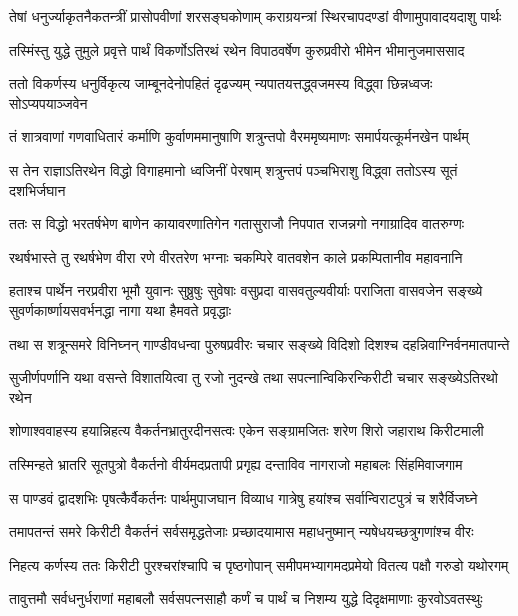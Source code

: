 \twolineshloka
{तेषां धनुर्ज्याकृतनैकतन्त्रीं प्रासोपवीणां शरसङ्घकोणाम्}
{कराग्रयन्त्रां स्थिरचापदण्डां वीणामुपावादयदाशु पार्थः}


\twolineshloka
{तस्मिंस्तु युद्धे तुमुले प्रवृत्ते पार्थं विकर्णोऽतिरथं रथेन}
{विपाठवर्षेण कुरुप्रवीरो भीमेन भीमानुजमाससाद}


\twolineshloka
{ततो विकर्णस्य धनुर्विकृत्य जाम्बूनदेनोपहितं दृढज्यम्}
{न्यपातयत्तद्ध्वजमस्य विद्ध्वा छिन्नध्वजः सोऽप्यपयाञ्जवेन}


\twolineshloka
{तं शात्रवाणां गणवाधितारं कर्माणि कुर्वाणममानुषाणि}
{शत्रुन्तपो वैरममृष्यमाणः समार्पयत्कूर्मनखेन पार्थम्}


\twolineshloka
{स तेन राज्ञाऽतिरथेन विद्धो विगाहमानो ध्वजिनीं पेरषाम्}
{शत्रुन्तपं पञ्चभिराशु विद्ध्वा ततोऽस्य सूतं दशभिर्जघान}


\twolineshloka
{ततः स विद्धो भरतर्षभेण बाणेन कायावरणातिगेन}
{गतासुराजौ निपपात राजन्नगो नगाग्रादिव वातरुग्णः}


\twolineshloka
{रथर्षभास्ते तु रथर्षभेण वीरा रणे वीरतरेण भग्नाः}
{चकम्पिरे वातवशेन काले प्रकम्पितानीव महावनानि}


\threelineshloka
{हताश्च पार्थेन नरप्रवीरा भूमौ युवानः सुष्रुषुः सुवेषाः}
{वसुप्रदा वासवतुल्यवीर्याः पराजिता वासवजेन सङ्ख्ये}
{सुवर्णकार्ष्णायसवर्भनद्धा नागा यथा हैमवते प्रवृद्धाः}


\twolineshloka
{तथा स शत्रून्समरे विनिघ्नन् गाण्डीवधन्वा पुरुषप्रवीरः}
{चचार सङ्ख्ये विदिशो दिशश्च दहन्निवाग्निर्वनमातपान्ते}


\twolineshloka
{सुजीर्णपर्णानि यथा वसन्ते विशातयित्वा तु रजो नुदन्खे}
{तथा सपत्नान्विकिरन्किरीटी चचार सङ्ख्येऽतिरथो रथेन}


\twolineshloka
{शोणाश्ववाहस्य हयान्निहत्य वैकर्तनभ्रातुरदीनसत्वः}
{एकेन सङ्ग्रामजितः शरेण शिरो जहाराथ किरीटमाली}


\twolineshloka
{तस्मिन्हते भ्रातरि सूतपुत्रो वैकर्तनो वीर्यमदप्रतापी}
{प्रगृह्य दन्ताविव नागराजो महाबलः सिंहमिवाजगाम}


\twolineshloka
{स पाण्डवं द्वादशभिः पृषत्कैर्वैकर्तनः पार्थमुपाजघान}
{विव्याध गात्रेषु हयांश्च सर्वान्विराटपुत्रं च शरैर्विजघ्ने}


\fourlineindentedshloka
{तमापतन्तं समरे किरीटी}
{वैकर्तनं सर्वसमृद्धतेजाः}
{प्रच्छादयामास महाधनुष्मान्}
{न्यषेधयच्छत्रुगणांश्च वीरः}


\twolineshloka
{निहत्य कर्णस्य ततः किरीटी पुरश्चरांश्चापि च पृष्ठगोपान्}
{समीपमभ्यागमदप्रमेयो वितत्य पक्षौ गरुडो यथोरगम्}


\twolineshloka
{तावुत्तमौ सर्वधनुर्धराणां महाबलौ सर्वसपत्नसाहौ}
{कर्णं च पार्थं च निशम्य युद्धे दिदृक्षमाणाः कुरवोऽवतस्थुः}


